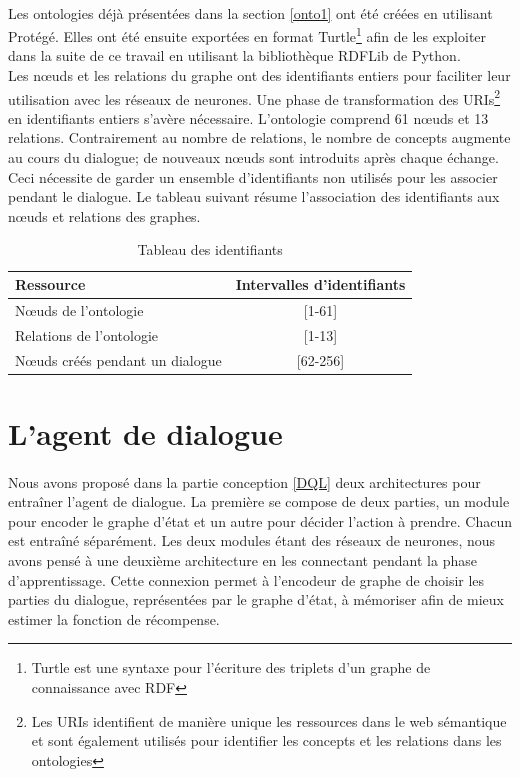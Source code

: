 \paragraph{}Les ontologies déjà présentées dans la section \ref{onto1} ont été créées en utilisant Protégé. Elles ont été ensuite exportées en format Turtle\footnote{Turtle est une syntaxe pour l'écriture des triplets d'un graphe de connaissance avec RDF} afin de les exploiter dans la suite de ce travail en utilisant la bibliothèque RDFLib de Python.\\[6pt]
Les n\oe{}uds et les relations du graphe ont des identifiants entiers pour faciliter leur utilisation avec les réseaux de neurones. Une phase de transformation des URIs\footnote{Les URIs identifient de manière unique les ressources dans le web sémantique et sont également utilisés pour identifier les concepts et les relations dans les ontologies} en identifiants entiers s'avère nécessaire. L'ontologie comprend 61 n\oe{}uds et 13 relations. Contrairement au nombre de relations, le nombre de concepts augmente au cours du dialogue; de nouveaux n\oe{}uds sont introduits après chaque échange. Ceci nécessite de garder un ensemble d'identifiants non utilisés pour les associer pendant le dialogue. Le tableau suivant résume l'association des identifiants aux n\oe{}uds et relations des graphes.
\begin{table}[H]
	\begin{center}
		
		\begin{tabular}{|l|c|}
			\hline
			\textbf{Ressource} & \textbf{Intervalles d'identifiants}\\
			\hline
			N\oe{}uds de l'ontologie & [1-61]\\
			\hline
			Relations de l'ontologie & [1-13]\\
			\hline
			N\oe{}uds créés pendant un dialogue & [62-256]\\
			\hline
		\end{tabular}
		\caption{Tableau des identifiants}\label{table_ids}
	\end{center}
\end{table}
\section{L'agent de dialogue}\label{DMReal}
\paragraph{}Nous avons proposé dans la partie conception \ref{DQL} deux architectures pour entraîner l'agent de dialogue. La première se compose de deux parties, un module pour encoder le graphe d'état et un autre pour décider l'action à prendre. Chacun est entraîné séparément. Les deux modules étant des réseaux de neurones, nous avons pensé à une deuxième architecture en les connectant pendant la phase d'apprentissage. Cette connexion permet à l'encodeur de graphe de choisir les parties du dialogue, représentées par le graphe d'état, à mémoriser afin de mieux estimer la fonction de récompense.
